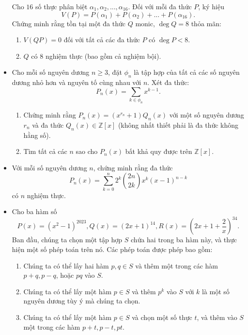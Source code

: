 \documentclass[11pt]{scrartcl}
\begin{document}
\begin{itemize}[label=, leftmargin=0em, itemsep=-0em]
\begin{btvn}
        Cho $16$ số thực phân biệt $\alpha_1,\alpha_2,...,\alpha_{16}$. Đối với mỗi đa thức $P$, ký hiệu
        \[ V(P)=P(\alpha_1)+P(\alpha_2)+...+P(\alpha_{16}). \]
        Chứng minh rằng tồn tại một đa thức $Q$ monic, $\deg Q=8$ thỏa mãn:
            \begin{enumerate}
                \item $V(QP)=0$ đối với tất cả các đa thức $P$ có $\deg P<8$.
                \item $Q$ có $8$ nghiệm thực (bao gồm cả nghiệm bội).
            \end{enumerate}
        \end{btvn}
        \item \begin{btvn}
            Cho mỗi số nguyên dương $n\ge 3$, đặt $\phi_n$ là tập hợp của tất cả các số nguyên dương nhỏ hơn và nguyên tố cùng nhau với $n$. Xét đa thức:
            $$P_n(x)=\sum_{k\in\phi_n} {x^{k-1}}.$$
            \begin{enumerate}[label=(\alph*)]
                \item  Chứng minh rằng $P_n(x)=(x^{r_n}+1)Q_n(x)$ với một số nguyên dương $r_n$ và đa thức $Q_n(x)\in\mathbb{Z}[x]$ (không nhất thiết phải là đa thức không hằng số).
                \item Tìm tất cả các $n$ sao cho $P_n(x)$ bất khả quy được trên $\mathbb{Z}[x]$.
            \end{enumerate}
        \end{btvn}
        \item \begin{btvn}
            Với mỗi số nguyên dương $n$, chứng minh rằng đa thức$$P_n(x)=\sum _{k=0}^n2^k\binom{2n}{2k}x^k(x-1)^{n-k}$$ có $n$ nghiệm thực.
        \end{btvn}
        \item \begin{btvn} Cho ba hàm số
            $$P(x) = (x^2-1)^{2023}, Q(x) = (2x+1)^{14}, R(x) = \left(2x+1+\frac 2x \right)^{34}.$$
            Ban đầu, chúng ta chọn một tập hợp $S$ chứa hai trong ba hàm này, và thực hiện một số phép toán trên nó. Các phép toán được phép bao gồm:
            \begin{enumerate}
                \item Chúng ta có thể lấy hai hàm $p, q \in S$ và thêm một trong các hàm $p+q, p-q$, hoặc $pq$ vào $S$.
                \item Chúng ta có thể lấy một hàm $p \in S$ và thêm $p^k$ vào $S$ với $k$ là một số nguyên dương tùy ý mà chúng ta chọn.
                \item Chúng ta có thể lấy một hàm $p \in S$ và chọn một số thực $t$, và thêm vào $S$ một trong các hàm $p+t, p-t, pt$.
            \end{enumerate}
            

\end{btvn}
\end{itemize}
\end{document}
